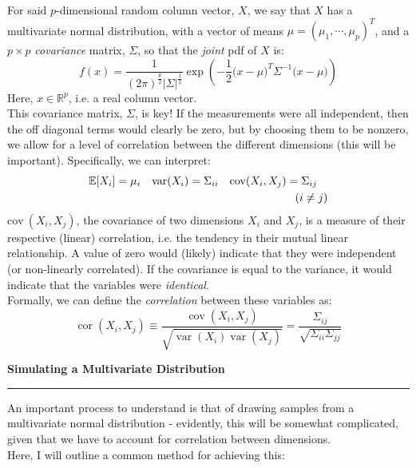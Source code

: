 \documentclass[12pt]{article}
\newcommand{\minisection}[1]{
    \par\vspace{0.25cm}
    \textbf{#1}\par
    \vspace{0.1cm}
    \hrule
    \vspace{0.25cm}
}
\DeclareMathOperator{\var}{var}
\DeclareMathOperator{\cov}{cov}
\DeclareMathOperator{\cor}{cor}
\begin{document}
    For said $p$-dimensional random column vector, $X$, we say that $X$ has a multivariate normal distribution, with a vector of means $\mu = (\mu_1,\cdots,\mu_p)^T$, and a $p\times p$ \textit{covariance} matrix, $\Sigma$, so that the \textit{joint} pdf of $X$ is:
    \begin{equation*}
        f(x) = \frac{1}{(2\pi)^{\frac p2}\left|\Sigma\right|^{\frac 12}}\exp\left(-\frac 12\big( x-\mu\big)^T\Sigma^{-1}\big( x-\mu\big)\right)
    \end{equation*}
    Here, $x\in \mathbb R^p$, i.e. a real column vector.\\
    This covariance matrix, $\Sigma$, is key! If the measurements were all independent, then the off diagonal terms would clearly be zero, but by choosing them to be nonzero, we allow for a level of correlation between the different dimensions (this will be important). Specifically, we can interpret:
    \begin{align*}
        \mathbb E[X_i] &= \mu_i & \var(X_i) &= \Sigma_{ii} & \cov(X_i,X_j) &= \Sigma_{ij}\\
        & & & & &\hphantom{=}(i\neq j)
    \end{align*}
    $\text{cov}\ (X_i,X_j)$, the covariance of two dimensions $X_i$ and $X_j$, is a measure of their respective (linear) correlation, i.e. the tendency in their mutual linear relationship. A value of zero would (likely) indicate that they were independent (or non-linearly correlated). If the covariance is equal to the variance, it would indicate that the variables were \textit{identical}.\\
    Formally, we can define the \textit{correlation} between these variables as:
    \begin{equation*}
        \cor(X_i,X_j) \equiv \frac{\cov(X_i,X_j)}{\sqrt{\var(X_i)\var(X_j)}} = \frac{\Sigma_{ij}}{\sqrt{\Sigma_{ii}\Sigma_{jj}}}
    \end{equation*}
    \minisection{Simulating a Multivariate Distribution}
    An important process to understand is that of drawing samples from a multivariate normal distribution - evidently, this will be somewhat complicated, given that we have to account for correlation between dimensions.\\
    Here, I will outline a common method for achieving this:
\end{document}
